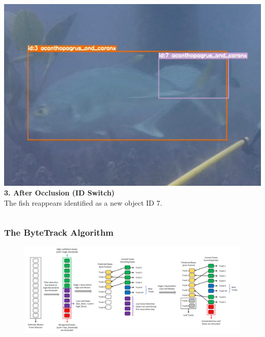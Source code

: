 \documentclass[serif]{beamer}  %
\begin{document}
\begin{frame}
\begin{columns}[T,totalwidth=\textwidth]
        \begin{column}{0.32\textwidth}
            \centering
            \includegraphics[width=\linewidth]{images/wrong_occlusion_3.png}
            \vspace{0.5em}
            \tiny
            \textbf{3. After Occlusion (ID Switch)} \\
            The fish reappears identified as a new object ID 7.
        \end{column}
    \end{columns}
\end{frame}


\begin{frame}
    \frametitle{The ByteTrack Algorithm}
    
    \begin{figure}
        \centering
        \includegraphics[width=1\linewidth]{images/bytetrack.png}
    \end{figure}
    
\end{frame}
\end{document}
